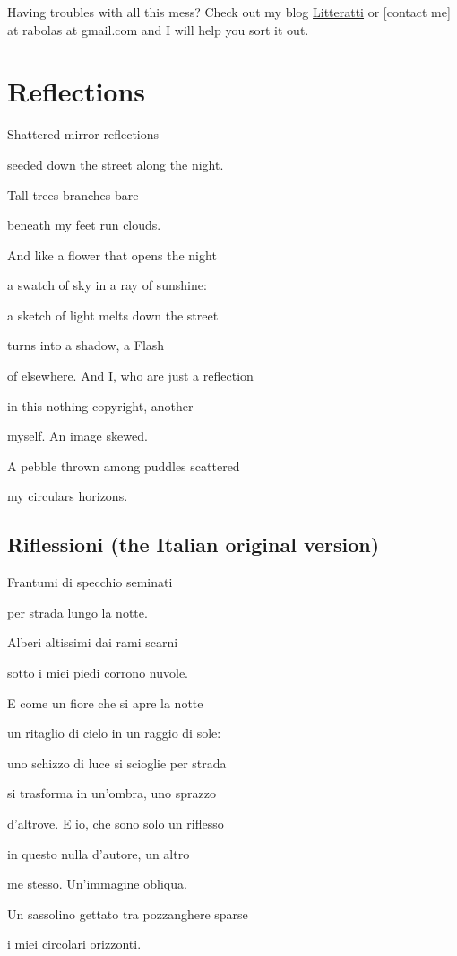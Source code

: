 \documentclass[]{book}
\begin{document}
Having troubles with all this mess? Check out my blog
\href{http://litteratti.wordpress.com/}{Litteratti} or {[}contact me{]}
at rabolas at gmail.com and I will help you sort it out.

\chapter{Reflections}\label{reflections}

Shattered mirror reflections

seeded down the street along the night.

Tall trees branches bare

beneath my feet run clouds.

And like a flower that opens the night

a swatch of sky in a ray of sunshine:

a sketch of light melts down the street

turns into a shadow, a Flash

of elsewhere. And I, who are just a reflection

in this nothing copyright, another

myself. An image skewed.

A pebble thrown among puddles scattered

my circulars horizons.

\section*{Riflessioni (the Italian original
version)}\label{riflessioni-the-italian-original-version}

Frantumi di specchio seminati

per strada lungo la notte.

Alberi altissimi dai rami scarni

sotto i miei piedi corrono nuvole.

E come un fiore che si apre la notte

un ritaglio di cielo in un raggio di sole:

uno schizzo di luce si scioglie per strada

si trasforma in un'ombra, uno sprazzo

d'altrove. E io, che sono solo un riflesso

in questo nulla d'autore, un altro

me stesso. Un'immagine obliqua.

Un sassolino gettato tra pozzanghere sparse

i miei circolari orizzonti.
\end{document}
